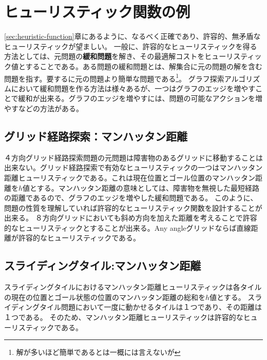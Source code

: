 \section{ヒューリスティック関数の例}
\label{sec:heuristic-example}

\ref{sec:heuristic-function}章にあるように、なるべく正確であり、許容的、無矛盾なヒューリスティックが望ましい。
一般に、許容的なヒューリスティックを得る方法としては、元問題の{\bf 緩和問題}を解き、その最適解コストをヒューリスティック値とすることである。ある問題の緩和問題とは、解集合に元の問題の解を含む問題を指す。要するに元の問題より簡単な問題である\footnote{解が多いほど簡単であるとは一概には言えないが}。
グラフ探索アルゴリズムにおいて緩和問題を作る方法は様々あるが、一つはグラフのエッジを増やすことで緩和が出来る。グラフのエッジを増やすには、問題の可能なアクションを増やすなどの方法がある。

\subsection{グリッド経路探索：マンハッタン距離}

４方向グリッド経路探索問題の元問題は障害物のあるグリッドに移動することは出来ない。グリッド経路探索で有効なヒューリスティックの一つはマンハッタン距離ヒューリスティックである。これは現在位置とゴール位置のマンハッタン距離を$h$値とする。マンハッタン距離の意味としては、障害物を無視した最短経路の距離であるので、グラフのエッジを増やした緩和問題である。
このように、問題の性質を理解していれば許容的なヒューリスティック関数を設計することが出来る。
８方向グリッドにおいても斜め方向を加えた距離を考えることで許容的なヒューリスティックとすることが出来る。Any angleグリッドならば直線距離が許容的なヒューリスティックである。


\subsection{スライディングタイル:マンハッタン距離}
スライディングタイルにおけるマンハッタン距離ヒューリスティックは各タイルの現在の位置とゴール状態の位置のマンハッタン距離の総和を$h$値とする。
スライディングタイル問題において一度に動かせるタイルは１つであり、その距離は１つである。
そのため、マンハッタン距離ヒューリスティックは許容的なヒューリスティックである。

